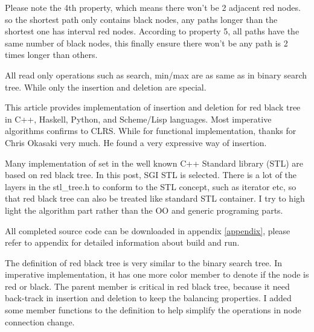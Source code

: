 \documentclass{article}
\begin{document}
Please note the 4th property, which means there won't be 2 adjacent red nodes. so the shortest path only contains black nodes, any paths longer than the shortest one has interval red nodes. According to property 5, all paths have the same number of black nodes, this finally ensure there won't be any path is 2 times longer than others\cite{wiki}.

All read only operations such as search, min/max are as same as in binary search tree. While only the insertion and deletion are special.

This article provides implementation of insertion and deletion for red black tree in C++, Haskell, Python, and Scheme/Lisp languages. Most imperative algorithms confirms to CLRS\cite{CLRS}. While for functional implementation, thanks for Chris Okasaki very much. He found a very expressive way\cite{okasaki} of insertion.

Many implementation of set in the well known C++ Standard library
(STL) are based on red black tree. In this post, SGI STL\cite{sgi-stl} is
selected. There is a lot of the layers in the stl\_tree.h to conform
to the STL concept, such as iterator etc, so that red black tree can
also be treated like standard STL container. I try to high light the
algorithm part rather than the OO and generic programing parts.

All completed source code can be downloaded in appendix \ref{appendix}, please refer to appendix for detailed information about build and run.

The definition of red black tree is very similar to the binary search tree.
In imperative implementation, it has one more color member to denote if the node is red or black. The parent member is critical in red black tree, because
it need back-track in insertion and deletion to keep the balancing properties.
I added some member functions to the definition to help simplify the operations
in node connection change.
\end{document}
